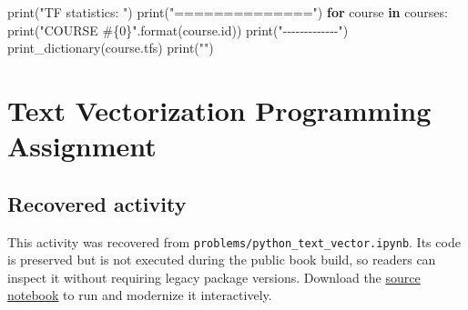 \documentclass[
  letterpaper,
]{scrbook}
\newenvironment{Shaded}{\begin{snugshade}}{\end{snugshade}}
\newcommand{\BuiltInTok}[1]{\textcolor[rgb]{0.00,0.23,0.31}{#1}}
\newcommand{\ControlFlowTok}[1]{\textcolor[rgb]{0.00,0.23,0.31}{\textbf{#1}}}
\newcommand{\KeywordTok}[1]{\textcolor[rgb]{0.00,0.23,0.31}{\textbf{#1}}}
\newcommand{\NormalTok}[1]{\textcolor[rgb]{0.00,0.23,0.31}{#1}}
\newcommand{\SpecialCharTok}[1]{\textcolor[rgb]{0.37,0.37,0.37}{#1}}
\newcommand{\StringTok}[1]{\textcolor[rgb]{0.13,0.47,0.30}{#1}}
\begin{document}
\begin{Shaded}
\begin{Highlighting}[]
\BuiltInTok{print}\NormalTok{(}\StringTok{"TF statistics: "}\NormalTok{)}
\BuiltInTok{print}\NormalTok{(}\StringTok{"=============="}\NormalTok{)}
\ControlFlowTok{for}\NormalTok{ course }\KeywordTok{in}\NormalTok{ courses: }
    \BuiltInTok{print}\NormalTok{(}\StringTok{"COURSE \#}\SpecialCharTok{\{0\}}\StringTok{"}\NormalTok{.}\BuiltInTok{format}\NormalTok{(course.}\BuiltInTok{id}\NormalTok{))}
    \BuiltInTok{print}\NormalTok{(}\StringTok{"{-}{-}{-}{-}{-}{-}{-}{-}{-}{-}{-}{-}{-}"}\NormalTok{)}
\NormalTok{    print\_dictionary(course.tfs)}
    \BuiltInTok{print}\NormalTok{(}\StringTok{""}\NormalTok{)}
\end{Highlighting}
\end{Shaded}

\chapter*{Text Vectorization Programming
Assignment}\label{ch-lab-text-vectorization-assignment}


\section*{Recovered
activity}\label{sec-lab-text-vectorization-assignment}


\begin{tcolorbox}[enhanced jigsaw, arc=.35mm, bottomrule=.15mm, bottomtitle=1mm, breakable, colback=white, colbacktitle=quarto-callout-note-color!10!white, colframe=quarto-callout-note-color-frame, coltitle=black, left=2mm, leftrule=.75mm, opacityback=0, opacitybacktitle=0.6, rightrule=.15mm, title=\textcolor{quarto-callout-note-color}{\faInfo}\hspace{0.5em}{Historical source and execution note}, titlerule=0mm, toprule=.15mm, toptitle=1mm]

This activity was recovered from
\texttt{problems/python\_text\_vector.ipynb}. Its code is preserved but
is not executed during the public book build, so readers can inspect it
without requiring legacy package versions. Download the
\href{../notebooks/text-vectorization-assignment.ipynb}{source notebook}
to run and modernize it interactively.

\end{tcolorbox}
\end{document}
